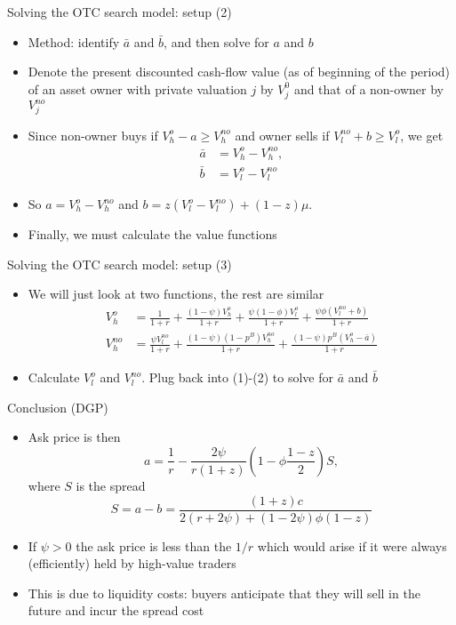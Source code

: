 \documentclass[english,10pt
,aspectratio=169
]{beamer}
\begin{document}
\begin{frame}{Solving the OTC search model: setup (2)}
	\begin{itemize}
		\item Method: identify $\bar{a}$ and $\bar{b}$, and then solve for $a$ and $b$
		\item Denote the present discounted cash-flow value (as of beginning of the period) of an asset owner with private valuation $j$ by $V^0_j$ and that of a non-owner by $V^{no}_j$
		\item Since non-owner buys if $V^o_h-a \geq V^{no}_h$ and owner sells if $V^{no}_l+b \geq V^o_l$, we get
		\begin{align}
		\bar{a} 	&= V^o_h-V^{no}_h, \\
		\bar{b}	&= V^o_l-V^{no}_l 
		\end{align}
		\item So $a=V^o_h-V^{no}_h$ and $b=z(V^o_l-V^{no}_l ) + (1-z)\mu$.
		\item Finally, we must calculate the value functions
	\end{itemize}
\end{frame}


\begin{frame}{Solving the OTC search model: setup (3)}
	\begin{itemize}
		\item We will just look at two functions, the rest are similar
		\begin{align*}
		V^o_h 	& = \frac{1}{1+r} + \frac{(1-\psi)V^o_h}{1+r} + \frac{\psi(1-\phi)V^o_l}{1+r}+\frac{\psi\phi(V^{no}_l+b)}{1+r} \\
		V^{no}_h 	& = \frac{\psi V^{no}_l}{1+r} + \frac{(1-\psi)(1-p^B)V^{no}_h}{1+r}+\frac{(1-\psi)p^B (V^o_h-\bar{a})}{1+r}
		\end{align*}
		\item Calculate $V^o_l$ and $V^{no}_l$. Plug back into (1)-(2) to solve for $\bar{a}$ and $\bar{b}$
	\end{itemize}
\end{frame}


\begin{frame}{Conclusion (DGP)}
	\begin{itemize}
		\item Ask price is then
		\[
		a=\frac{1}{r}-\frac{2\psi}{r(1+z)}\left(1-\phi\frac{1-z}{2}\right)S,
		\]
		where $S$ is the spread
		\[
		S=a-b=\frac{(1+z)c}{2(r+2\psi)+(1-2\psi)\phi(1-z)}
		\]
		\item If $\psi>0$ the ask price is less than the $1/r$ which would arise if it were always (efficiently) held by high-value traders
		\item This is due to liquidity costs: buyers anticipate that they will sell in the future and incur the spread cost
	\end{itemize}
\end{frame}
\end{document}
